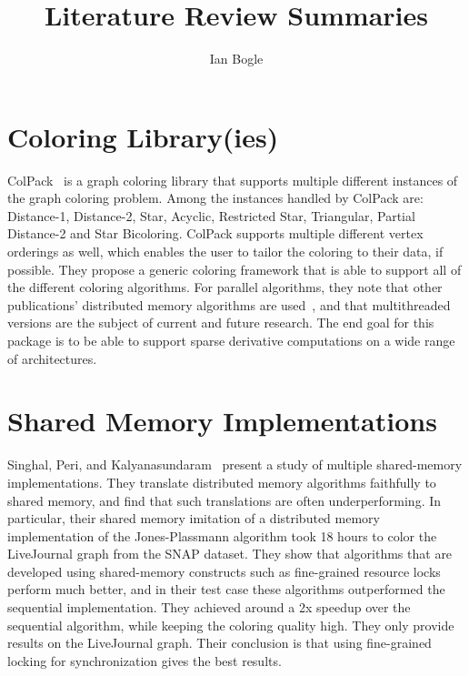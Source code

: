 \documentclass{article}
\begin{document}
\title{Literature Review Summaries}
\author{Ian Bogle}
\maketitle

\section{Coloring Library(ies)}

ColPack~\cite{gebremedhin2013colpack} is a graph coloring library that supports multiple
different instances of the graph coloring problem. Among the instances handled by ColPack are:
Distance-1, Distance-2, Star, Acyclic, Restricted Star, Triangular, Partial Distance-2 and 
Star Bicoloring. ColPack supports multiple different vertex orderings as well, which enables 
the user to tailor the coloring to their data, if possible. They propose a generic coloring framework
that is able to support all of the different coloring algorithms. For parallel algorithms, they note
that other publications' distributed memory algorithms are 
used~\cite{bozdaug2008framework,bozdaug2010distributed}, and that multithreaded versions are
the subject of current and future research. The end goal for this package is to be able to support
sparse derivative computations on a wide range of architectures.

\section{Shared Memory Implementations}

Singhal, Peri, and Kalyanasundaram~\cite{singhal2017practical} present a study of multiple 
shared-memory implementations. They translate distributed memory algorithms faithfully to shared memory,
and find that such translations are often underperforming. In particular, their shared memory imitation
of a distributed memory implementation of the Jones-Plassmann algorithm took 18 hours to color the
LiveJournal graph from the SNAP dataset. They show that algorithms that are developed using 
shared-memory constructs such as fine-grained resource locks perform much better, and in their
test case these algorithms outperformed the sequential implementation. They achieved around a 2x speedup
over the sequential algorithm, while keeping the coloring quality high. They only provide results on 
the LiveJournal graph. Their conclusion is that using fine-grained locking for synchronization gives
the best results.
\end{document}
